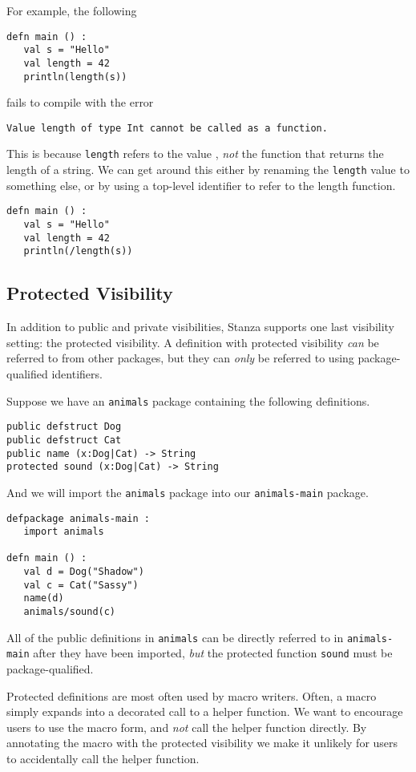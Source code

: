 \documentclass[10pt,oneside]{book}
\begin{document}
For example, the following
\begin{lstlisting}
defn main () :
   val s = "Hello"
   val length = 42
   println(length(s))
\end{lstlisting}
fails to compile with the error
\begin{lstlisting}
Value length of type Int cannot be called as a function.
\end{lstlisting}
This is because \texttt{\frenchspacing length} refers to the value \texttt{}, {\em not} the function that returns the length of a string. We can get around this either by renaming the \texttt{\frenchspacing length} value to something else, or by using a top-level identifier to refer to the length function.
\begin{lstlisting}
defn main () :
   val s = "Hello"
   val length = 42
   println(/length(s))
\end{lstlisting}

\subsection*{Protected Visibility}
In addition to public and private visibilities, Stanza supports one last visibility setting: the protected visibility. A definition with protected visibility {\em can} be referred to from other packages, but they can {\em only} be referred to using package-qualified identifiers. 

Suppose we have an \texttt{\frenchspacing animals} package containing the following definitions.
\begin{lstlisting}
public defstruct Dog
public defstruct Cat
public name (x:Dog|Cat) -> String
protected sound (x:Dog|Cat) -> String
\end{lstlisting}

And we will import the \texttt{\frenchspacing animals} package into our \texttt{\frenchspacing animals-main} package.
\begin{lstlisting}
defpackage animals-main :
   import animals

defn main () :
   val d = Dog("Shadow")
   val c = Cat("Sassy")
   name(d)
   animals/sound(c)
\end{lstlisting}

All of the public definitions in \texttt{\frenchspacing animals} can be directly referred to in \texttt{\frenchspacing animals-main} after they have been imported, {\em but} the protected function \texttt{\frenchspacing sound} must be package-qualified. 

Protected definitions are most often used by macro writers. Often, a macro simply expands into a decorated call to a helper function. We want to encourage users to use the macro form, and {\em not} call the helper function directly. By annotating the macro with the protected visibility we make it unlikely for users to accidentally call the helper function. 
\end{document}

